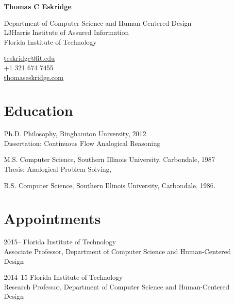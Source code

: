 \documentclass[12pt,letterpaper]{report}
\newcommand{\myname}{Thomas C Eskridge}
\newcommand{\namefont}[1]{{\normalfont\bfseries\Huge{#1}}}
\begin{document}
    \raggedright{}

    \namefont{\myname}

    \vspace{1em}
    \begin{minipage}[t]{0.700\textwidth}
        Department of Computer Science and Human-Centered Design \\
        L3Harris Institute of Assured Information \\
        Florida Institute of Technology
    \end{minipage}
    \begin{minipage}[t]{0.295\textwidth}
        \flushright{}
        \href{mailto:teskridge@fit.edu}{teskridge@fit.edu} \\
        +1 321 674 7455 \\
        \href{https://thomaseskridge.com}{thomaseskridge.com}
    \end{minipage}


    \section*{Education}

    \begin{tablist}

        \item[Ph.D.] \tab{}Philosophy, Binghamton University, 2012 \\
                            Dissertation: Continuous Flow Analogical Reasoning
        \item[M.S.]  \tab{}Computer Science, Southern Illinois University, Carbondale,  1987 \\
			 Thesis: Analogical Problem Solving,
        \item[B.S.]  \tab{}Computer Science, Southern Illinois University, Carbondale,  1986.


    \end{tablist}



    \section*{Appointments}

    \begin{tablist}

        \item[2015--]   \tab{}Florida Institute of Technology \\
                              Associate Professor, Department of Computer Science and Human-Centered Design

        \item[2014--15]   \tab{}Florida Institute of Technology \\
                              Research Professor, Department of Computer Science and Human-Centered Design
                              
    \end{tablist}
\end{document}
